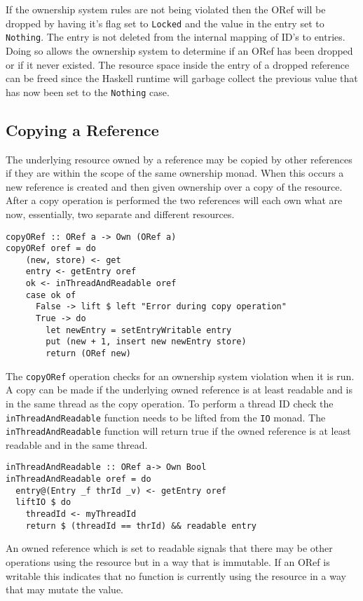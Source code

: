\documentclass[onehalf,11pt]{beavtex}
\begin{document}
If the ownership system rules are not being violated then the ORef will be
dropped by having it's flag set to \texttt{Locked} and the value in the
entry set to \texttt{Nothing}. The entry is not deleted from the internal mapping of
ID's to entries. Doing so allows the ownership system to determine if an ORef
has been dropped or if it never existed.
The resource space inside the entry of a dropped reference can be freed since
the Haskell runtime will garbage collect the previous value that has now been
set to the \texttt{Nothing} case.

\subsection{Copying a Reference}

The underlying resource owned by a reference may be copied by other references
if they are within the scope of the same ownership monad.  When this occurs a new
reference is created and then given ownership over a copy of the resource.
After a copy operation is performed the two references will each own what are now,
essentially, two separate and different resources.

\begin{verbatim}
copyORef :: ORef a -> Own (ORef a)
copyORef oref = do
    (new, store) <- get
    entry <- getEntry oref
    ok <- inThreadAndReadable oref
    case ok of
      False -> lift $ left "Error during copy operation"
      True -> do
        let newEntry = setEntryWritable entry
        put (new + 1, insert new newEntry store)
        return (ORef new)
\end{verbatim}

The \texttt{copyORef} operation checks for an ownership system violation when
it is run.
A copy can be made if the underlying owned reference is at least readable and
is in the same thread as the copy operation.
To perform a thread ID check the \texttt{inThreadAndReadable} function
needs to be lifted from the \texttt{IO} monad.
The \texttt{inThreadAndReadable} function will return true if the owned reference
is at least readable and in the same thread.

\begin{verbatim}
inThreadAndReadable :: ORef a-> Own Bool
inThreadAndReadable oref = do
  entry@(Entry _f thrId _v) <- getEntry oref
  liftIO $ do
    threadId <- myThreadId
    return $ (threadId == thrId) && readable entry
\end{verbatim}

An owned reference which is set to readable signals that there may be other
operations using the resource but in a way that is immutable.
If an ORef is writable this indicates that no function is currently using the
resource in a way that may mutate the value.
\end{document}

